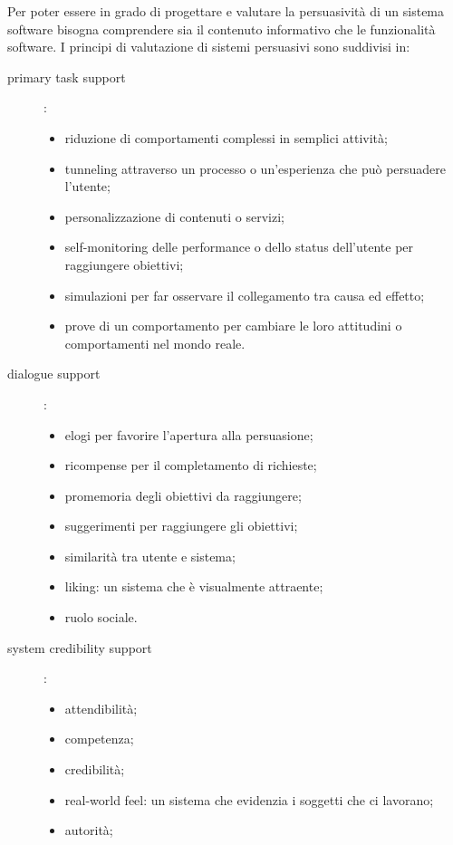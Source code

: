 Per poter essere in grado di progettare e valutare la persuasività di un sistema software bisogna comprendere sia il contenuto informativo che le funzionalità software. I principi di valutazione di sistemi persuasivi sono suddivisi in:
\begin{description}
    \item[primary task support]:
    \begin{itemize}
        \item riduzione di comportamenti complessi in semplici attività;
        \item tunneling attraverso un processo o un'esperienza che può persuadere l'utente;
        \item personalizzazione di contenuti o servizi;
        \item self-monitoring delle performance o dello status dell'utente per raggiungere obiettivi;
        \item simulazioni per far osservare il collegamento tra causa ed effetto;
        \item prove di un comportamento per cambiare le loro attitudini o comportamenti nel mondo reale.
    \end{itemize}
    \item[dialogue support]:
    \begin{itemize}
        \item elogi per favorire l'apertura alla persuasione;
        \item ricompense per il completamento di richieste;
        \item promemoria degli obiettivi da raggiungere;
        \item suggerimenti per raggiungere gli obiettivi;
        \item similarità tra utente e sistema;
        \item liking: un sistema che è visualmente attraente;
        \item ruolo sociale.
    \end{itemize}
    \item[system credibility support]:
    \begin{itemize}
        \item attendibilità;
        \item competenza;
        \item credibilità;
        \item real-world feel: un sistema che evidenzia i soggetti che ci lavorano;
        \item autorità;

\end{itemize}
\end{description}
